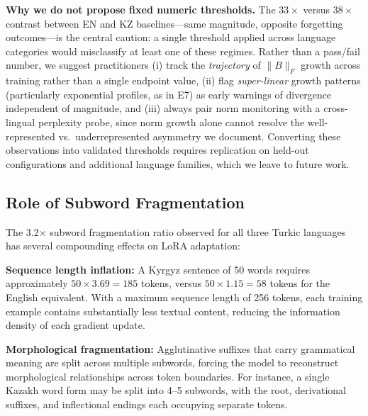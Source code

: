 \documentclass[11pt]{article}
\begin{document}
\textbf{Why we do not propose fixed numeric thresholds.} The $33\times$ versus $38\times$ contrast between EN and KZ baselines---same magnitude, opposite forgetting outcomes---is the central caution: a single threshold applied across language categories would misclassify at least one of these regimes. Rather than a pass/fail number, we suggest practitioners (i) track the \emph{trajectory} of $\|B\|_F$ growth across training rather than a single endpoint value, (ii) flag \emph{super-linear} growth patterns (particularly exponential profiles, as in E7) as early warnings of divergence independent of magnitude, and (iii) always pair norm monitoring with a cross-lingual perplexity probe, since norm growth alone cannot resolve the well-represented vs.\ underrepresented asymmetry we document. Converting these observations into validated thresholds requires replication on held-out configurations and additional language families, which we leave to future work.

\subsection{Role of Subword Fragmentation}

The 3.2$\times$ subword fragmentation ratio observed for all three Turkic languages has several compounding effects on LoRA adaptation:

\textbf{Sequence length inflation:} A Kyrgyz sentence of 50 words requires approximately $50 \times 3.69 = 185$ tokens, versus $50 \times 1.15 = 58$ tokens for the English equivalent. With a maximum sequence length of 256 tokens, each training example contains substantially less textual content, reducing the information density of each gradient update.

\textbf{Morphological fragmentation:} Agglutinative suffixes that carry grammatical meaning are split across multiple subwords, forcing the model to reconstruct morphological relationships across token boundaries. For instance, a single Kazakh word form may be split into 4--5 subwords, with the root, derivational suffixes, and inflectional endings each occupying separate tokens.
\end{document}
